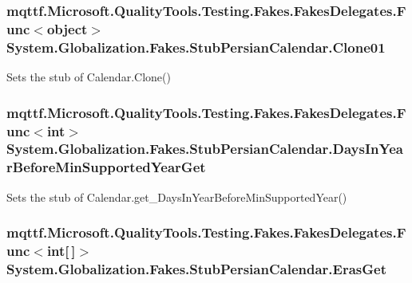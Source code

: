 \hypertarget{class_system_1_1_globalization_1_1_fakes_1_1_stub_persian_calendar_aa81667ac08e8f7762d3084b859ec7618}{
\subsubsection[{Clone01}]{\setlength{\rightskip}{0pt plus 5cm}mqttf.\-Microsoft.\-Quality\-Tools.\-Testing.\-Fakes.\-Fakes\-Delegates.\-Func$<$object$>$ System.\-Globalization.\-Fakes.\-Stub\-Persian\-Calendar.\-Clone01}}\label{class_system_1_1_globalization_1_1_fakes_1_1_stub_persian_calendar_aa81667ac08e8f7762d3084b859ec7618}


Sets the stub of Calendar.\-Clone()

\hypertarget{class_system_1_1_globalization_1_1_fakes_1_1_stub_persian_calendar_a0384520af3524b88f0155e1b05174c10}{
\subsubsection[{Days\-In\-Year\-Before\-Min\-Supported\-Year\-Get}]{\setlength{\rightskip}{0pt plus 5cm}mqttf.\-Microsoft.\-Quality\-Tools.\-Testing.\-Fakes.\-Fakes\-Delegates.\-Func$<$int$>$ System.\-Globalization.\-Fakes.\-Stub\-Persian\-Calendar.\-Days\-In\-Year\-Before\-Min\-Supported\-Year\-Get}}\label{class_system_1_1_globalization_1_1_fakes_1_1_stub_persian_calendar_a0384520af3524b88f0155e1b05174c10}


Sets the stub of Calendar.\-get\-\_\-\-Days\-In\-Year\-Before\-Min\-Supported\-Year()

\hypertarget{class_system_1_1_globalization_1_1_fakes_1_1_stub_persian_calendar_ac0bb7c890d2eb2cfcb8ce1f06a6bbe26}{
\subsubsection[{Eras\-Get}]{\setlength{\rightskip}{0pt plus 5cm}mqttf.\-Microsoft.\-Quality\-Tools.\-Testing.\-Fakes.\-Fakes\-Delegates.\-Func$<$int\mbox{[}$\,$\mbox{]}$>$ System.\-Globalization.\-Fakes.\-Stub\-Persian\-Calendar.\-Eras\-Get}}\label{class_system_1_1_globalization_1_1_fakes_1_1_stub_persian_calendar_ac0bb7c890d2eb2cfcb8ce1f06a6bbe26}


